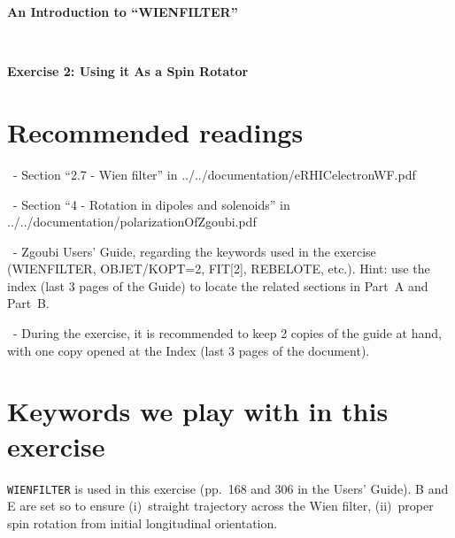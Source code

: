 \documentclass[10pt]{article}
\newcommand{\nin}{\noindent~}
\begin{document}
\thispagestyle{empty}

\begin{minipage}{1.\linewidth}
\bf
\vspace{-2ex}
  
\vspace{-2ex}
  
\vspace{-2ex}
  
\end{minipage}


\vspace{5ex}

\centerline{\LARGE \bf
  An Introduction to ``WIENFILTER'' 
}

~

\centerline{\LARGE \bf
Exercise 2: Using it As a Spin Rotator
}

\vspace{5ex}
\author{
F.~M\'eot
\\
Collider-Accelerator Department, BNL, Upton, NY 11973 \\
}


\section*{Recommended readings}

\smallskip
\nin - Section ``2.7 - Wien filter''  in ../../documentation/eRHICelectronWF.pdf

\smallskip
\nin - Section ``4 - Rotation in dipoles and solenoids''  in ../../documentation/polarizationOfZgoubi.pdf

\smallskip
\nin - Zgoubi Users' Guide, regarding the keywords used in the exercise (WIENFILTER, OBJET/KOPT=2, FIT[2], REBELOTE, etc.). Hint: use the index (last 3 pages of the Guide) to locate the related sections in Part~A and Part~B. 

\smallskip
\nin - During the exercise, it is recommended to keep 2 copies of the guide at hand, with one copy opened at the Index (last 3 pages of the document).

\section*{Keywords we play with in this exercise}

\texttt{WIENFILTER} is used in this exercise (pp.~168 and 306 in the Users' Guide).  B and E are set so to ensure (i)~straight trajectory across the Wien filter,  (ii)~proper spin rotation from initial longitudinal orientation.
\end{document}
